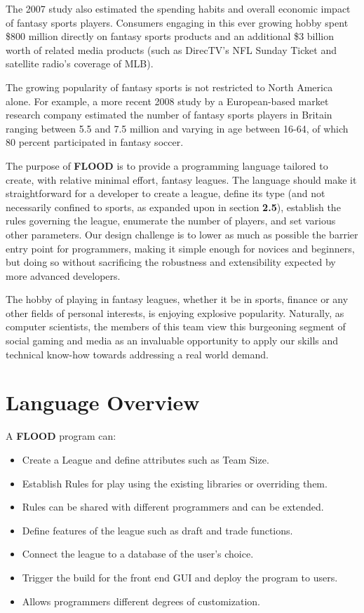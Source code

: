 \documentclass[12pt]{article}
\begin{document}
The 2007 study also estimated the spending habits and overall economic impact of fantasy sports players. Consumers engaging in this ever growing hobby spent \$800 million directly on fantasy sports products and an additional \$3 billion worth of related media products (such as DirecTV's NFL Sunday Ticket and satellite radio's coverage of MLB).

The growing popularity of fantasy sports is not restricted to North America alone. For example, a more recent 2008 study by a European-based market research company estimated the number of fantasy sports players in Britain ranging between 5.5 and 7.5 million and varying in age between 16-64, of which 80 percent participated in fantasy soccer.

The purpose of \textbf{FLOOD} is to provide a programming language tailored to create, with relative minimal effort, fantasy leagues. The language should make it straightforward for a developer to create a league, define its type (and not necessarily confined to sports, as expanded upon in section \textbf{2.5}), establish the rules governing the league, enumerate the number of players, and set various other parameters. Our design challenge is to lower as much as possible the barrier entry point for programmers, making it simple enough for novices and beginners, but doing so without sacrificing the robustness and extensibility expected by more advanced developers.

The hobby of playing in fantasy leagues, whether it be in sports, finance or any other fields of personal interests, is enjoying explosive popularity. Naturally, as computer scientists, the members of this team view this burgeoning segment of social gaming and media as an invaluable opportunity to apply our skills and technical know-how towards addressing a real world demand.

\section{Language Overview}

A \textbf{FLOOD} program can:
\begin{itemize}
\item Create a League and define attributes such as Team Size.
\item Establish Rules for play using the existing libraries or overriding them.
\item Rules can be shared with different programmers and can be extended.
\item Define features of the league such as draft and trade functions.
\item Connect the league to a database of the user's choice.
\item Trigger the build for the front end GUI and deploy the program to users.
\item Allows programmers different degrees of customization.
\end{itemize}
\end{document}
